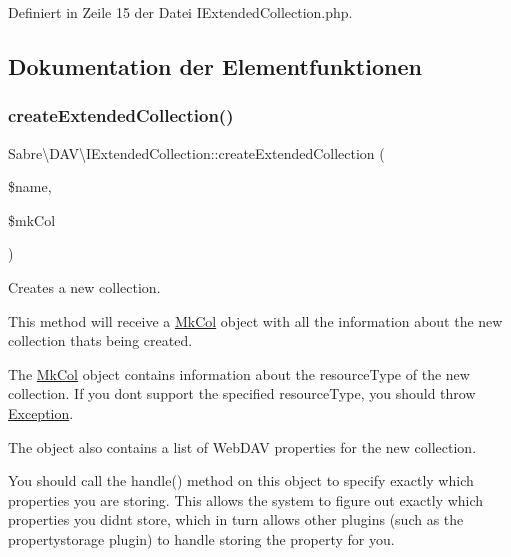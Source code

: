 Definiert in Zeile 15 der Datei I\+Extended\+Collection.\+php.



\subsection{Dokumentation der Elementfunktionen}
\mbox{\label{interface_sabre_1_1_d_a_v_1_1_i_extended_collection_ae17c248155a90ae664ad7fb9854ddf63}} 
\subsubsection{\texorpdfstring{create\+Extended\+Collection()}{createExtendedCollection()}}
{\footnotesize\ttfamily Sabre\textbackslash{}\+D\+A\+V\textbackslash{}\+I\+Extended\+Collection\+::create\+Extended\+Collection (\begin{DoxyParamCaption}\item[{}]{\$name,  }\item[{\mbox{\hyperlink{class_sabre_1_1_d_a_v_1_1_mk_col}{Mk\+Col}}}]{\$mk\+Col }\end{DoxyParamCaption})}

Creates a new collection.

This method will receive a \mbox{\hyperlink{class_sabre_1_1_d_a_v_1_1_mk_col}{Mk\+Col}} object with all the information about the new collection that\textquotesingle{}s being created.

The \mbox{\hyperlink{class_sabre_1_1_d_a_v_1_1_mk_col}{Mk\+Col}} object contains information about the resource\+Type of the new collection. If you don\textquotesingle{}t support the specified resource\+Type, you should throw \mbox{\hyperlink{class_sabre_1_1_d_a_v_1_1_exception}{Exception}}.

The object also contains a list of Web\+D\+AV properties for the new collection.

You should call the handle() method on this object to specify exactly which properties you are storing. This allows the system to figure out exactly which properties you didn\textquotesingle{}t store, which in turn allows other plugins (such as the propertystorage plugin) to handle storing the property for you.


